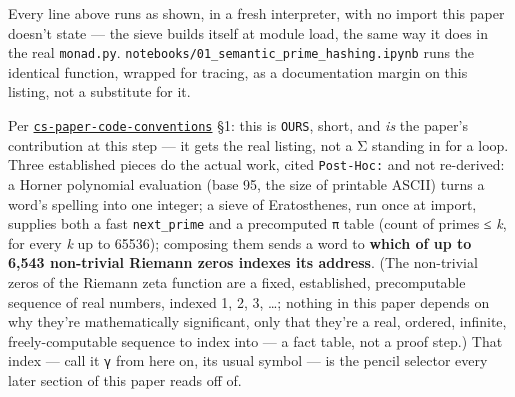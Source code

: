\documentclass[
  10pt,
]{article}
\begin{document}
Every line above runs as shown, in a fresh interpreter, with no import
this paper doesn't state --- the sieve builds itself at module load, the
same way it does in the real \texttt{monad.py}.
\texttt{notebooks/01\_semantic\_prime\_hashing.ipynb} runs the identical
function, wrapped for tracing, as a documentation margin on this
listing, not a substitute for it.

Per
\href{../../.claude/skills/cs-paper-code-conventions/SKILL.md}{\texttt{cs-paper-code-conventions}}
§1: this is \texttt{OURS}, short, and \emph{is} the paper's contribution
at this step --- it gets the real listing, not a Σ standing in for a
loop. Three established pieces do the actual work, cited
\texttt{Post-Hoc:} and not re-derived: a Horner polynomial evaluation
(base 95, the size of printable ASCII) turns a word's spelling into one
integer; a sieve of Eratosthenes, run once at import, supplies both a
fast \texttt{next\_prime} and a precomputed \texttt{π} table (count of
primes ≤ \emph{k}, for every \emph{k} up to 65536); composing them sends
a word to \textbf{which of up to 6,543 non-trivial Riemann zeros indexes
its address}. (The non-trivial zeros of the Riemann zeta function are a
fixed, established, precomputable sequence of real numbers, indexed 1,
2, 3, \ldots; nothing in this paper depends on why they're
mathematically significant, only that they're a real, ordered, infinite,
freely-computable sequence to index into --- a fact table, not a proof
step.) That index --- call it \texttt{γ} from here on, its usual symbol
--- is the pencil selector every later section of this paper reads off
of.
\end{document}
